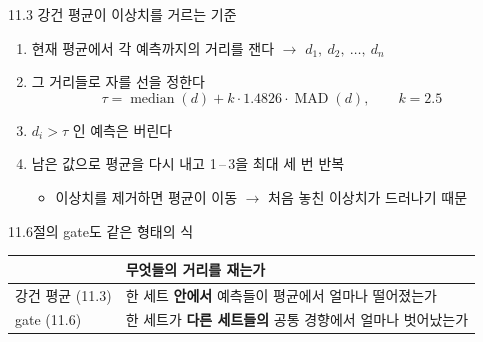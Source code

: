 \documentclass[aspectratio=169,11pt]{beamer}
\begin{document}
\begin{frame}{11.3 강건 평균이 이상치를 거르는 기준}
  \begin{enumerate}
    \item 현재 평균에서 각 예측까지의 거리를 잰다
      $\rightarrow$ $d_1,\ d_2,\ \dots,\ d_n$
      \vspace{1mm}
    \item 그 거리들로 자를 선을 정한다
      \[
        \tau = \operatorname{median}(d) + k \cdot 1.4826 \cdot \operatorname{MAD}(d),
        \qquad k = 2.5
      \]
    \item $d_i > \tau$ 인 예측은 버린다
      \vspace{1mm}
    \item 남은 값으로 평균을 다시 내고 1\,--\,3을 최대 세 번 반복
      \begin{itemize}
        \item 이상치를 제거하면 평균이 이동
          $\rightarrow$ 처음 놓친 이상치가 드러나기 때문
      \end{itemize}
  \end{enumerate}
  \vfill
  \begin{block}{11.6절의 gate도 같은 형태의 식}
    \begin{center}
      \begin{tabular}{ll}
        \toprule
         & 무엇들의 거리를 재는가 \\
        \midrule
        강건 평균 (11.3) & 한 세트 \textbf{안에서} 예측들이 평균에서 얼마나 떨어졌는가 \\
        gate (11.6) & 한 세트가 \textbf{다른 세트들의} 공통 경향에서 얼마나 벗어났는가 \\
        \bottomrule
      \end{tabular}
    \end{center}
  \end{block}
\end{frame}
\end{document}
